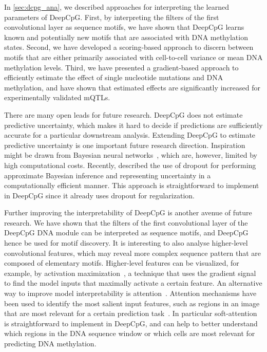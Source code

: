 In \cref{sec:dcpg_ana}, we described approaches for interpreting the learned parameters of DeepCpG. First, by interpreting the filters of the first convolutional layer as sequence motifs, we have shown that DeepCpG learns known and potentially new motifs that are associated with DNA methylation states. Second, we have developed a scoring-based approach to discern between motifs that are either primarily associated with cell-to-cell variance or mean DNA methylation levels. Third, we have presented a gradient-based approach to efficiently estimate the effect of single nucleotide mutations and DNA methylation, and have shown that estimated effects are significantly increased for experimentally validated mQTLs.

There are many open leads for future research. DeepCpG does not estimate predictive uncertainty, which makes it hard to decide if predictions are sufficiently accurate for a particular downstream analysis. Extending DeepCpG to estimate predictive uncertainty is one important future research direction. Inspiration might be drawn from Bayesian neural networks~\citep{neal_bayesian_2012}, which are, however, limited by high computational costs. Recently, \citet{gal_dropout_2015-1} described the use of dropout for performing approximate Bayesian inference and representing uncertainty in a computationally efficient manner. This approach is straightforward to implement in DeepCpG since it already uses dropout for regularization.

Further improving the interpretability of DeepCpG is another avenue of future research. We have shown that the filters of the first convolutional layer of the DeepCpG DNA module can be interpreted as sequence motifs, and DeepCpG hence be used for motif discovery. It is interesting to also analyse higher-level convolutional features, which may reveal more complex sequence pattern that are composed of elementary motifs. Higher-level features can be visualized, for example, by activation maximization~\citep{mahendran_visualizing_2015}, a technique that uses the gradient signal to find the model inputs that maximally activate a certain feature. An alternative way to improve model interpretability is attention~\citep{cho_describing_2015}. Attention mechanisms have been used to identify the most salient input features, such as regions in an image that are most relevant for a certain prediction task~\citep{cho_describing_2015,xu_show_2015,sharma_action_2015}. In particular soft-attention is straightforward to implement in DeepCpG, and can help to better understand which regions in the DNA sequence window or which cells are most relevant for predicting DNA methylation.

